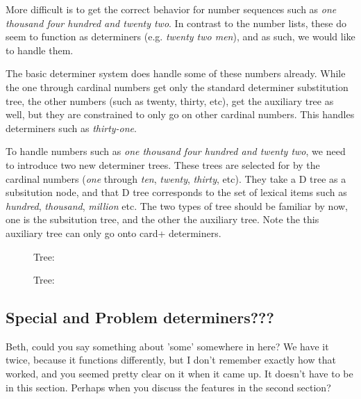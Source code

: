 More difficult is to get the correct behavior for number sequences
such as {\it one
thousand four hundred and twenty two}.  In contrast to the number lists, these
do seem to function as determiners (e.g. {\it twenty two men\/}), and as such, we would like
to handle them. 

The basic determiner system does handle some of these numbers already.  While
the one through cardinal numbers get only the standard determiner substitution
tree, the other numbers (such as twenty, thirty, etc), get the auxiliary tree
as well, but they are constrained to only go on other cardinal numbers.  This
handles determiners such as {\it thirty-one}.  

To handle numbers such as {\it one thousand four hundred and twenty two}, we need
to introduce two new determiner trees.  These trees are selected for by the
cardinal numbers ({\it one\/} through {\it ten}, {\it twenty}, {\it thirty}, etc).  They take a D
tree as a subsitution node, and that D tree corresponds to the set of lexical
items such as {\it hundred}, {\it thousand}, {\it million\/} etc.  The two types of tree
should be familiar by now, one is the subsitution tree, and the other the
auxiliary tree.  Note the this auxiliary tree can only go onto card+
determiners.

\begin{figure}[ht]
\centering
{}
\caption{ Tree:  }
\end{figure}

\begin{figure}[ht]
\centering
{}
\caption{ Tree: }
\end{figure}

\subsection{Special and Problem determiners???}

Beth,  could you say something about 'some' somewhere in here?  We have it
twice, because it functions differently, but I don't remember exactly how that
worked, and you seemed pretty clear on it when it came up.  It doesn't have to
be in this section.  Perhaps when you discuss the features in the second
section?

			


